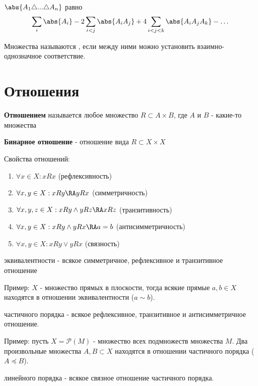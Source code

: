 \documentclass[a4paper, 14pt]{article}
\begin{document}
    \begin{theorem}
        $  \abs{A_1 \triangle ... \triangle A_n} $ равно
        \[
        \sum_i  \abs{A_i} -
        2\sum_{i<j} \abs{A_iA_j} +
        4\sum_{i<j<k} \abs{A_iA_jA_k} - \dots
        \]
    \end{theorem}
    
    \begin{definition}
        Множества называются {}, если между ними можно
        установить взаимно-однозначное соответствие.
    \end{definition}

    \section{Отношения}
    \begin{definition}
        {\bf Отношением} называется любое множество 
        $R \subset A \times B$, где $A$ и $B$ - какие-то множества
    \end{definition}
    \begin{definition}
        {\bf Бинарное отношение} - отношение вида $R \subset X \times X$
    \end{definition}

    Свойства отношений:
    \begin{enumerate}
        \item $\forall x \in X: xRx$ (рефлексивность)
        \item $\forall x,y \in X: xRy \RA  yRx$ (симметричность)
        \item $\forall x,y,z \in X: xRy \land yRz \RA xRz$ (транзитивность)
        \item $\forall x,y \in X: xRy \land yRx \RA a = b$ (антисимметричность)
        \item $\forall x,y \in X: xRy \lor yRx$ (связность)
    \end{enumerate}

    \begin{definition}
        { эквивалентности} - всякое симметричное, рефлексивное и транзитивное отношение
    \end{definition}
    Пример: $X$ - множество прямых в плоскости, тогда всякие прямые $a, b \in X$
    находятся в отношении эквивалентности ($a \sim b$).

    \begin{definition}
        { частичного порядка} - всякое рефлексивное, транзитивное и
        антисимметричное отношение.
    \end{definition}
    Пример: пусть $X = \mathcal{P}(M)$ - множество всех подмножеств множества $M$.
    Два произвольные множества $A, B \subset X$ находятся в отношении частичного
    порядка ($A \preceq B$).

    \begin{definition}
        { линейного порядка} - всякое связное отношение частичного порядка.
    \end{definition}
    
\end{document}
